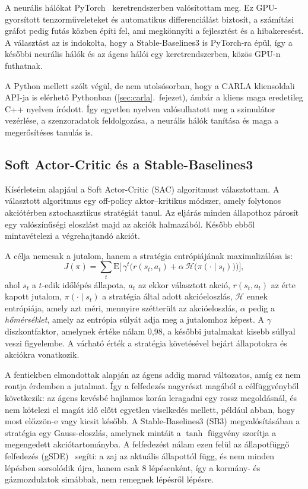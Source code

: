 \documentclass[a4paper,12pt,oneside]{article}
\begin{document}
A neurális hálókat PyTorch~\cite{paszke2019pytorch} keretrendszerben
valósítottam meg. Ez GPU-gyorsított tenzorműveleteket és automatikus
differenciálást biztosít, a számítási gráfot pedig futás közben építi fel, ami
megkönnyíti a fejlesztést és a hibakeresést. A választást az is indokolta, hogy
a Stable-Baselines3 is PyTorch-ra épül, így a későbbi neurális hálók és az ágens hálói
egy keretrendszerben, közös GPU-n futhatnak.

A Python mellett szólt végül, de nem utolsósorban, hogy a CARLA kliensoldali API-ja is
elérhető Pythonban (\ref{sec:carla}.~fejezet), ámbár a kliens maga eredetileg C++ nyelven íródott. Így egyetlen nyelven valósulhatott
meg a szimulátor vezérlése, a szenzoradatok feldolgozása, a neurális hálók
tanítása és maga a megerősítéses tanulás is.

\subsection{Soft Actor-Critic és a Stable-Baselines3}
\label{sec:sac}

Kísérleteim alapjául a Soft Actor-Critic (SAC) algoritmust választottam. A választott algoritmus
egy off-policy aktor--kritikus módszer, amely folytonos akciótérben sztochasztikus
stratégiát tanul. Az eljárás minden állapothoz párosít egy valószínűségi eloszlást majd az akciók halmazából.
Később ebből mintavételezi a végrehajtandó akciót. 

A célja nemcsak a jutalom, hanem a stratégia entrópiájának maximalizálása is:
\begin{equation}
  J(\pi) = \sum_{t} \mathrm{E}\Big[\, \gamma^{t} \Big( r(s_t, a_t)
  + \alpha\, \mathcal{H}\big(\pi(\cdot \mid s_t)\big) \Big) \Big],
\end{equation}
ahol $s_t$ a $t$-edik időlépés állapota, $a_t$ az ekkor választott akció,
$r(s_t, a_t)$ az érte kapott jutalom, $\pi(\cdot \mid s_t)$ a stratégia által
adott akcióeloszlás, $\mathcal{H}$ ennek entrópiája, amely azt méri, 
mennyire szétterült az akcióeloszlás, $\alpha$ pedig a \emph{hőmérséklet}, 
amely az entrópia
súlyát adja meg a jutalomhoz képest. 
A $\gamma$ diszkontfaktor, amelynek értéke nálam 0,98,
a későbbi jutalmakat kisebb súllyal veszi figyelembe. A várható érték a
stratégia követésével bejárt állapotokra és akciókra vonatkozik.

A fentiekben elmondottak alapján az ágens addig marad változatos, amíg ez nem rontja érdemben a jutalmat.
Így a felfedezés nagyrészt magából a célfüggvényből következik: az ágens
kevésbé hajlamos korán leragadni egy rossz megoldásnál, és nem kötelezi el
magát idő előtt 
egyetlen viselkedés mellett, például abban, hogy most előzzön-e 
vagy kicsit később. A Stable-Baselines3 (SB3) megvalósításában
a stratégia egy Gauss-eloszlás,
amelynek mintáit a $\tanh$ függvény szorítja a megengedett akciótartományba.
A felfedezést nálam ezen felül az állapotfüggő felfedezés
(gSDE)~\cite{raffin2022gsde} segíti: a zaj az aktuális állapottól függ, és
nem minden lépésben sorsolódik újra, hanem csak 8 lépésenként, így a kormány-
és gázmozdulatok simábbak, nem remegnek lépésről lépésre.
\end{document}
